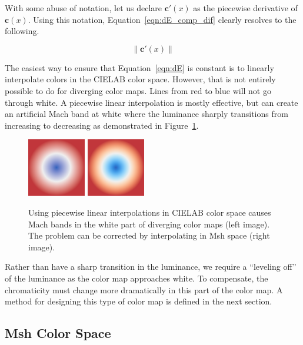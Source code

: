 \documentclass{vgtc}                          %
\newcommand{\Lab}{CIELAB\xspace}
\newcommand{\Msh}{Msh\xspace}
\newcommand*{\cvec}[1]{\mathbf{#1}}
\begin{document}
With some abuse of notation, let us declare $\cvec{c}'(x)$ as the piecewise
derivative of $\cvec{c}(x)$.  Using this notation,
Equation~\ref{eqn:dE_comp_dif} clearly resolves to the following.

\begin{equation}
  \left\lVert \cvec{c}'(x) \right\rVert
  \label{eqn:dE}
\end{equation}

The easiest way to ensure that Equation~\ref{eqn:dE} is constant
is to linearly interpolate colors in the \Lab color space.  However, that
is not entirely possible to do for diverging color maps.  Lines from red to
blue will not go through white.  A piecewise linear interpolation is mostly
effective, but can create an artificial Mach band at white where the
luminance sharply transitions from increasing to decreasing as demonstrated
in Figure~\ref{fig:LinearMachBands}.

\begin{figure}
  \centering
  \includegraphics[width=1in]{images/Cool2WarmLabRadial}
  \qquad
  \includegraphics[width=1in]{images/Cool2WarmRadial}
  \caption{Using piecewise linear interpolations in \Lab color space causes
    Mach bands in the white part of diverging color maps (left image).  The
    problem can be corrected by interpolating in \Msh space (right image).}
  \label{fig:LinearMachBands}
\end{figure}

Rather than have a sharp transition in the luminance, we require a
``leveling off'' of the luminance as the color map approaches white.  To
compensate, the chromaticity must change more dramatically in this part of
the color map.  A method for designing this type of color map is defined in
the next section.

\subsection{\Msh Color Space}
\label{sec:MshColorSpace}
\end{document}
